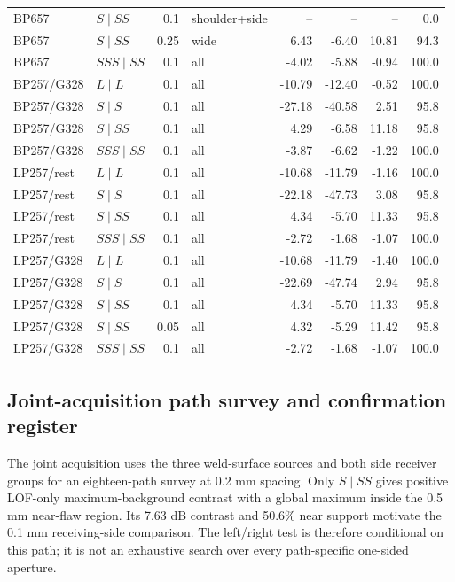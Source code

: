 \documentclass[11pt]{article}
\begin{document}
{\begin{longtable}{@{}llrlrrrr@{}}
BP657 & $S\mid SS$ & 0.1 & shoulder+side & -- & -- & -- & 0.0 \\
BP657 & $S\mid SS$ & 0.25 & wide & 6.43 & -6.40 & 10.81 & 94.3 \\
BP657 & $SSS\mid SS$ & 0.1 & all & -4.02 & -5.88 & -0.94 & 100.0 \\
BP257/G328 & $L\mid L$ & 0.1 & all & -10.79 & -12.40 & -0.52 & 100.0 \\
BP257/G328 & $S\mid S$ & 0.1 & all & -27.18 & -40.58 & 2.51 & 95.8 \\
BP257/G328 & $S\mid SS$ & 0.1 & all & 4.29 & -6.58 & 11.18 & 95.8 \\
BP257/G328 & $SSS\mid SS$ & 0.1 & all & -3.87 & -6.62 & -1.22 & 100.0 \\
LP257/rest & $L\mid L$ & 0.1 & all & -10.68 & -11.79 & -1.16 & 100.0 \\
LP257/rest & $S\mid S$ & 0.1 & all & -22.18 & -47.73 & 3.08 & 95.8 \\
LP257/rest & $S\mid SS$ & 0.1 & all & 4.34 & -5.70 & 11.33 & 95.8 \\
LP257/rest & $SSS\mid SS$ & 0.1 & all & -2.72 & -1.68 & -1.07 & 100.0 \\
LP257/G328 & $L\mid L$ & 0.1 & all & -10.68 & -11.79 & -1.40 & 100.0 \\
LP257/G328 & $S\mid S$ & 0.1 & all & -22.69 & -47.74 & 2.94 & 95.8 \\
LP257/G328 & $S\mid SS$ & 0.1 & all & 4.34 & -5.70 & 11.33 & 95.8 \\
LP257/G328 & $S\mid SS$ & 0.05 & all & 4.32 & -5.29 & 11.42 & 95.8 \\
LP257/G328 & $SSS\mid SS$ & 0.1 & all & -2.72 & -1.68 & -1.07 & 100.0 \\
\end{longtable}}

\subsection{Joint-acquisition path survey and confirmation register}
The joint acquisition uses the three weld-surface sources and both side receiver groups for an eighteen-path survey at 0.2 mm spacing. Only $S\mid SS$ gives positive LOF-only maximum-background contrast with a global maximum inside the 0.5 mm near-flaw region. Its 7.63 dB contrast and 50.6\% near support motivate the 0.1 mm receiving-side comparison. The left/right test is therefore conditional on this path; it is not an exhaustive search over every path-specific one-sided aperture.
\end{document}
